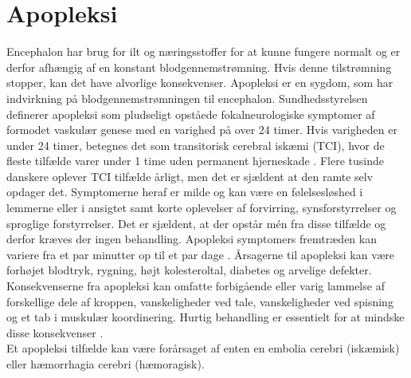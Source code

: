 \section{Apopleksi}
Encephalon har brug for ilt og næringsstoffer for at kunne fungere normalt og er derfor afhængig af en konstant blodgennemstrømning. Hvis denne tilstrømning stopper, kan det have alvorlige konsekvenser. \cite{Hjernesagen2015a} Apopleksi er en sygdom, som har indvirkning på blodgennemstrømningen til encephalon. Sundhedsstyrelsen definerer apopleksi som pludseligt opståede fokalneurologiske symptomer af formodet vaskulær genese med en varighed på over 24 timer. \cite{Sundhedsstyrelsen2009} Hvis varigheden er under 24 timer, betegnes det som transitorisk cerebral iskæmi (TCI), hvor de fleste tilfælde varer under 1 time uden permanent hjerneskade \cite{Sundhed.dk2014, Ritter2015}. Flere tusinde danskere oplever TCI tilfælde årligt, men det er sjældent at den ramte selv opdager det. Symptomerne heraf er milde og kan være en følelsesløshed i lemmerne eller i ansigtet samt korte oplevelser af forvirring, synsforstyrrelser og sproglige forstyrrelser. Det er sjældent, at der opstår mén fra disse tilfælde og derfor kræves der ingen behandling. \cite{Academic2015, Hjernesagen2015a} 
Apopleksi symptomers fremtræden kan variere fra et par minutter op til et par dage \cite{Academic2015, Kruuse2014}. 
Årsagerne til apopleksi kan være forhøjet blodtryk, rygning, højt kolesteroltal, diabetes og arvelige defekter. Konsekvenserne fra apopleksi kan omfatte forbigående eller varig lammelse af forskellige dele af kroppen, %
vanskeligheder ved tale, vanskeligheder ved spisning og et tab i muskulær koordinering. \cite{Academic2015} Hurtig behandling er essentielt for at mindske disse konsekvenser \cite{Hjernesagen2015a}. \\ %
Et apopleksi tilfælde kan være forårsaget af enten en embolia cerebri (iskæmisk) eller hæmorrhagia cerebri (hæmoragisk). \cite{Ritter2015} 

